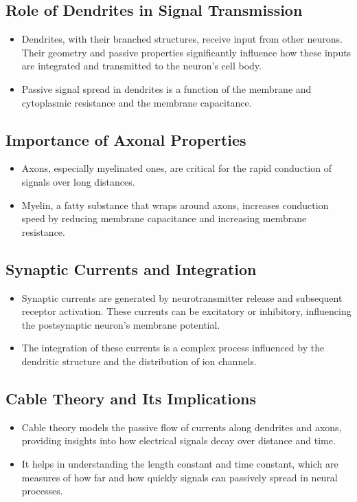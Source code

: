 \documentclass{article}
\begin{document}
\subsection{Role of Dendrites in Signal Transmission}
\begin{itemize}
    \item Dendrites, with their branched structures, receive input from other neurons. Their geometry and passive properties significantly influence how these inputs are integrated and transmitted to the neuron's cell body.
    \item Passive signal spread in dendrites is a function of the membrane and cytoplasmic resistance and the membrane capacitance.
\end{itemize}

\subsection{Importance of Axonal Properties}
\begin{itemize}
    \item Axons, especially myelinated ones, are critical for the rapid conduction of signals over long distances.
    \item Myelin, a fatty substance that wraps around axons, increases conduction speed by reducing membrane capacitance and increasing membrane resistance.
\end{itemize}

\subsection{Synaptic Currents and Integration}
\begin{itemize}
    \item Synaptic currents are generated by neurotransmitter release and subsequent receptor activation. These currents can be excitatory or inhibitory, influencing the postsynaptic neuron's membrane potential.
    \item The integration of these currents is a complex process influenced by the dendritic structure and the distribution of ion channels.
\end{itemize}

\subsection{Cable Theory and Its Implications}
\begin{itemize}
    \item Cable theory models the passive flow of currents along dendrites and axons, providing insights into how electrical signals decay over distance and time.
    \item It helps in understanding the length constant and time constant, which are measures of how far and how quickly signals can passively spread in neural processes.
\end{itemize}
\end{document}
